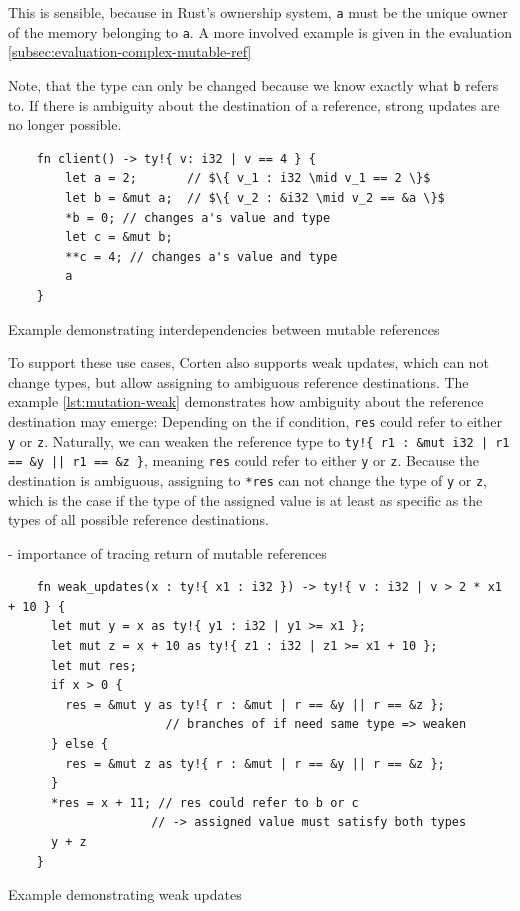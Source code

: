\documentclass{book}
\newcommand{\code}[1]{\texttt{#1}}
\theoremstyle{definition}
\begin{document}
This is sensible, because in Rust's ownership system, \code{a} must be the unique owner of the memory belonging to \code{a}. 
A more involved example is given in the evaluation \ref{subsec:evaluation-complex-mutable-ref}

Note, that the type can only be changed because we know exactly what \code{b} refers to. If there is ambiguity about the destination of a reference, strong updates are no longer possible.



\begin{listing}[h]
  \begin{verbatim}
    fn client() -> ty!{ v: i32 | v == 4 } {
        let a = 2;       // $\{ v_1 : i32 \mid v_1 == 2 \}$
        let b = &mut a;  // $\{ v_2 : &i32 \mid v_2 == &a \}$
        *b = 0; // changes a's value and type
        let c = &mut b;
        **c = 4; // changes a's value and type
        a
    }
  \end{verbatim}
  \caption{Example demonstrating interdependencies between mutable references}
  \label{lst:mutation-strong}
\end{listing}

To support these use cases, Corten also supports weak updates, which can not change types, but allow assigning to ambiguous reference destinations.
The example \ref{lst:mutation-weak} demonstrates how ambiguity about the reference destination may emerge: Depending on the if condition, \code{res} could refer to either \code{y} or \code{z}.
Naturally, we can weaken the reference type to \code{ty!\{ r1 : \&mut i32 | r1 == \&y || r1 == \&z \}}, meaning \code{res} could refer to either \code{y} or \code{z}.
Because the destination is ambiguous, assigning to \code{*res} can not change the type of \code{y} or \code{z}, which is the case if the type of the assigned value is at least as specific as the types of all possible reference destinations.

- importance of tracing return of mutable references



\begin{listing}[h]
  \begin{verbatim}
    fn weak_updates(x : ty!{ x1 : i32 }) -> ty!{ v : i32 | v > 2 * x1 + 10 } {
      let mut y = x as ty!{ y1 : i32 | y1 >= x1 };
      let mut z = x + 10 as ty!{ z1 : i32 | z1 >= x1 + 10 };
      let mut res;
      if x > 0 {
        res = &mut y as ty!{ r : &mut | r == &y || r == &z };
                      // branches of if need same type => weaken
      } else {
        res = &mut z as ty!{ r : &mut | r == &y || r == &z };
      }
      *res = x + 11; // res could refer to b or c 
                    // -> assigned value must satisfy both types
      y + z
    }
  \end{verbatim}
  \caption{Example demonstrating weak updates}
  \label{lst:mutation-weak}
\end{listing}
\end{document}
